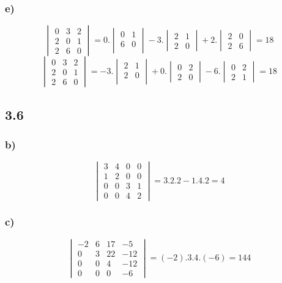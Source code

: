 \documentclass[11pt]{article}
\begin{document}
\subsubsection*{e)}
\[
\begin{vmatrix}
0 & 3 & 2 \\
2 & 0 & 1 \\
2 & 6 & 0
\end{vmatrix}
=0.\begin{vmatrix}
0 & 1 \\
6 & 0 \\
\end{vmatrix}
-3.\begin{vmatrix}
2 & 1 \\
2 & 0
\end{vmatrix}
+2.\begin{vmatrix}
2 & 0 \\
2 & 6
\end{vmatrix}
=18
\]
\[
\begin{vmatrix}
0 & 3 & 2 \\
2 & 0 & 1 \\
2 & 6 & 0
\end{vmatrix}
=-3.\begin{vmatrix}
2 & 1 \\
2 & 0 \\
\end{vmatrix}
+0.\begin{vmatrix}
0 & 2 \\
2 & 0
\end{vmatrix}
-6.\begin{vmatrix}
0 & 2 \\
2 & 1
\end{vmatrix}
=18
\]

\subsection*{3.6}
\subsubsection*{b)}
\[
\begin{vmatrix}
3 & 4 & 0 & 0\\
1 & 2 & 0 & 0\\
0 & 0 & 3 & 1\\
0 & 0 & 4 & 2
\end{vmatrix}
=3.2.2-1.4.2 = 4
\]

\subsubsection*{c)}
\[
\begin{vmatrix}
-2 & 6 & 17 & -5\\
0 & 3 & 22 & -12\\
0 & 0 & 4 & -12\\
0 & 0 & 0 & -6
\end{vmatrix}
=(-2).3.4.(-6)=144
\]
\end{document}

